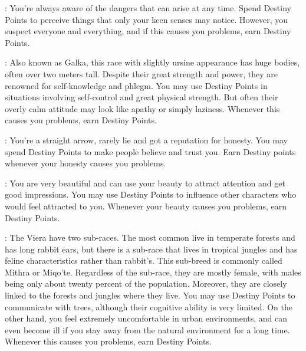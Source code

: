\begin{multicols}{2}
\begin{ffcolpage}
\end{ffcolpage} \pw \begin{ffcolpage}
: You're always aware of the dangers that can arise at any time. Spend Destiny Points to perceive things that only your keen senses may notice. However, you suspect everyone and everything, and if this causes you problems, earn Destiny Points.
\end{ffcolpage} \pw \begin{minipage}{.35\textwidth-2\columnsep}
: Also known as Galka, this race with slightly ursine appearance has huge bodies, often over two meters tall. Despite their great strength and power, they are renowned for self-knowledge and phlegm. You may use Destiny Points in situations involving self-control and great physical strength. But often their overly calm attitude may look like apathy or simply laziness. Whenever this causes you problems, earn Destiny Points.
\end{minipage} \pw \begin{ffcolpage}
: You're a straight arrow, rarely lie and got a reputation for honesty. You may spend Destiny Points to make people believe and trust you. Earn Destiny points whenever your honesty causes you problems.
\end{ffcolpage} \pw \begin{ffcolpage}
: You are very beautiful and can use your beauty to attract attention and get good impressions. You may use Destiny Points to influence other characters who would feel attracted to you. Whenever your beauty causes you problems, earn Destiny Points.
\end{ffcolpage} \pw \begin{minipage}{.35\textwidth-2\columnsep}
: The Viera have two sub-races. The most common live in temperate forests and has long rabbit ears, but there is a sub-race that lives in tropical jungles and has feline characteristics rather than rabbit’s. This sub-breed is commonly called Mithra or Miqo'te. Regardless of the sub-race, they are mostly female, with males being only about twenty percent of the population. Moreover, they are closely linked to the forests and jungles where they live. You may use Destiny Points to communicate with trees, although their cognitive ability is very limited. On the other hand, you feel extremely uncomfortable in urban environments, and can even become ill if you stay away from the natural environment for a long time. Whenever this causes you problems, earn Destiny Points.

\end{minipage}
\end{multicols}
